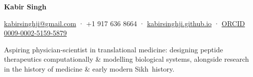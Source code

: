 


\begin{center}
{\Large\bfseries Kabir Singh}\par\vspace{3pt}
{\small \href{mailto:kabirsinghji@gmail.com}{kabirsinghji@gmail.com} ·
 +1 917 636 8664 ·
 \href{https://kabirsinghji.github.io}{kabirsinghji.github.io} ·
 \href{https://orcid.org/0009-0002-5159-5879}{ORCID 0009-0002-5159-5879}}
\end{center}\vspace{-5pt}

\noindent Aspiring physician-scientist in translational medicine: designing peptide therapeutics computationally \& modelling biological systems, alongside research in the history of medicine \& early modern \cvkeep{}Sikh~\cvlast{}history.\cvkeepend{}\par

